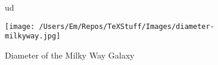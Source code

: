 \documentclass[float]{standalone}
\begin{document}
\begin{figure}
ud\begin{framed}
\texttt{[image: /Users/Em/Repos/TeXStuff/Images/diameter-milkyway.jpg]}
\caption{Diameter of the Milky Way Galaxy}
\end{framed}
\end{figure}
\end{document}
